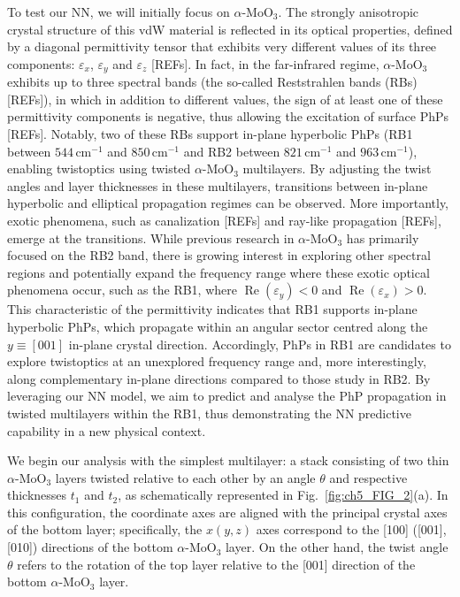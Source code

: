 To test our NN, we will initially focus on $\alpha\text{-}\mathrm{MoO}_3$. The strongly anisotropic crystal structure of this vdW material is reflected in its optical properties, defined by a diagonal permittivity tensor that exhibits very different values of its three components: $\varepsilon_x$, $\varepsilon_y$ and $\varepsilon_z$ [REFs]. In fact, in the far-infrared regime, $\alpha\text{-}\mathrm{MoO}_3$ exhibits up to three spectral bands (the so-called Reststrahlen bands (RBs) [REFs]), in which in addition to different values, the sign of at least one of these permittivity components is negative, thus allowing the excitation of surface PhPs [REFs]. Notably, two of these RBs support in-plane hyperbolic PhPs (RB1 between $544\,\mathrm{cm}^{-1}$ and $850\,\mathrm{cm}^{-1}$ and RB2 between $821\,\mathrm{cm}^{-1}$ and $963\,\mathrm{cm}^{-1}$), enabling twistoptics using twisted $\alpha\text{-}\mathrm{MoO}_3$ multilayers. By adjusting the twist angles and layer thicknesses in these multilayers, transitions between in-plane hyperbolic and elliptical propagation regimes can be observed. More importantly, exotic phenomena, such as canalization [REFs] and ray-like propagation [REFs], emerge at the transitions. While previous research in $\alpha\text{-}\mathrm{MoO}_3$ has primarily focused on the RB2 band, there is growing interest in exploring other spectral regions and potentially expand the frequency range where these exotic optical phenomena occur, such as the RB1, where $\operatorname{Re}(\varepsilon_y)<0$ and $\operatorname{Re}(\varepsilon_x)>0$. This characteristic of the permittivity indicates that RB1 supports in-plane hyperbolic PhPs, which propagate within an angular sector centred along the $y\equiv[001]$ in-plane crystal direction. Accordingly, PhPs in RB1 are candidates to explore twistoptics at an unexplored frequency range and, more interestingly, along complementary in-plane directions compared to those study in RB2. By leveraging our NN model, we aim to predict and analyse the PhP propagation in twisted multilayers within the RB1, thus demonstrating the NN predictive capability in a new physical context.

We begin our analysis with the simplest multilayer: a stack consisting of two thin $\alpha\text{-}\mathrm{MoO}_3$ layers twisted relative to each other by an angle $\theta$ and respective thicknesses $t_{1}$ and $t_{2}$, as schematically represented in Fig.~\ref{fig:ch5_FIG_2}(a). In this configuration, the coordinate axes are aligned with the principal crystal axes of the bottom layer; specifically, the $x(y,z)$ axes correspond to the [100] ([001], [010]) directions of the bottom $\alpha\text{-}\mathrm{MoO}_3$ layer. On the other hand, the twist angle $\theta$ refers to the rotation of the top layer relative to the [001] direction of the bottom $\alpha\text{-}\mathrm{MoO}_3$ layer.

